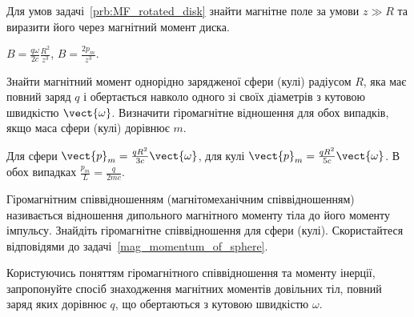 \begin{problem}
Для умов задачі~\ref{prb:MF_rotated_disk} знайти магнітне поле за умови $z \gg R$ та виразити його через магнітний момент диска.
\begin{solution}
	$B = \frac{q\omega}{2c}\frac{R^2}{z^3}$, $B = \frac{2p_m}{z^3}$.
\end{solution}
\end{problem}

\begin{problem}\label{mag_momentum_of_sphere}
Знайти магнітний момент однорідно зарядженої сфери (кулі) радіусом $R$, яка має повний заряд $q$ і обертається навколо одного зі своїх діаметрів з кутовою швидкістю $\vect{\omega}$. Визначити гіромагнітне відношення для обох випадків, якщо маса сфери (кулі) дорівнює $m$.
\begin{solution}
	Для сфери $\vect{p}_m = \frac{qR^2}{3c}\vect{\omega}$,
	для кулі $\vect{p}_m = \frac{qR^2}{5c}\vect{\omega}$.
	В обох випадках $\frac{p_m}{L} = \frac{q}{2mc}$.
\end{solution}
\end{problem}

\begin{problem}
    Гіромагнітним співвідношенням (магнітомеханічним співвідношенням) називається відношення дипольного магнітного моменту тіла до його моменту імпульсу. Знайдіть гіромагнітне співвідношення для сфери (кулі). Скористайтеся відповідями до задачі~\ref{mag_momentum_of_sphere}.
\end{problem}

\begin{problem}
    Користуючись поняттям гіромагнітного співвідношення та моменту інерції, запропонуйте спосіб знаходження магнітних моментів довільних тіл, повний заряд яких дорівнює $q$, що обертаються з кутовою швидкістю $\omega$.
\end{problem}



